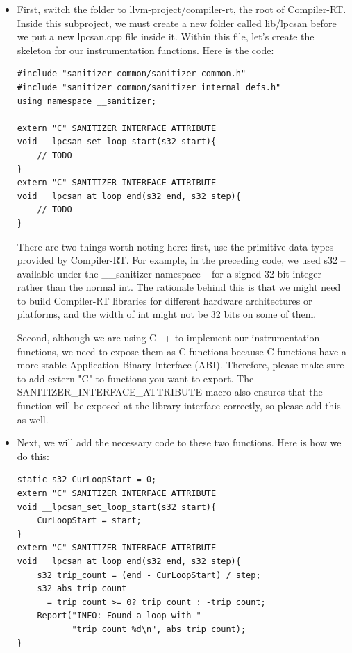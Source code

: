 \begin{itemize}
\item First, switch the folder to llvm-project/compiler-rt, the root of Compiler-RT. Inside this subproject, we must create a new folder called lib/lpcsan before we put a new lpcsan.cpp file inside it. Within this file, let's create the skeleton for our instrumentation functions. Here is the code:

\begin{lstlisting}[style=styleCXX]
#include "sanitizer_common/sanitizer_common.h"
#include "sanitizer_common/sanitizer_internal_defs.h"
using namespace __sanitizer;

extern "C" SANITIZER_INTERFACE_ATTRIBUTE
void __lpcsan_set_loop_start(s32 start){
	// TODO
}
extern "C" SANITIZER_INTERFACE_ATTRIBUTE
void __lpcsan_at_loop_end(s32 end, s32 step){
	// TODO
}
\end{lstlisting}

There are two things worth noting here: first, use the primitive data types provided by Compiler-RT. For example, in the preceding code, we used s32 – available under the \_\_sanitizer namespace – for a signed 32-bit integer rather than the normal int. The rationale behind this is that we might need to build Compiler-RT libraries for different hardware architectures or platforms, and the width of int might not be 32 bits on some of them.

Second, although we are using C++ to implement our instrumentation functions, we need to expose them as C functions because C functions have a more stable Application Binary Interface (ABI). Therefore, please make sure to add extern "C" to functions you want to export. The SANITIZER\_INTERFACE\_ATTRIBUTE macro also ensures that the function will be exposed at the library interface correctly, so please add this as well.

\item Next, we will add the necessary code to these two functions. Here is how we do this:

\begin{lstlisting}[style=styleCXX]
static s32 CurLoopStart = 0;
extern "C" SANITIZER_INTERFACE_ATTRIBUTE
void __lpcsan_set_loop_start(s32 start){
	CurLoopStart = start;
}
extern "C" SANITIZER_INTERFACE_ATTRIBUTE
void __lpcsan_at_loop_end(s32 end, s32 step){
	s32 trip_count = (end - CurLoopStart) / step;
	s32 abs_trip_count
	  = trip_count >= 0? trip_count : -trip_count;
	Report("INFO: Found a loop with "
	       "trip count %d\n", abs_trip_count);
}
\end{lstlisting}


\end{itemize}
